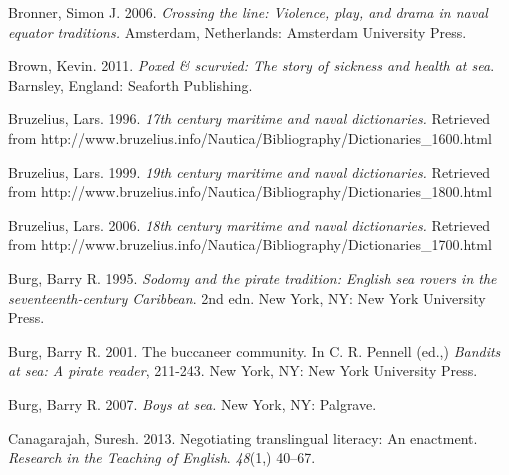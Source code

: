 \begin{styleStandard}
Bronner, Simon J. 2006.\textit{ Crossing the line: Violence, play, and drama in naval equator traditions. }Amsterdam, Netherlands: Amsterdam University Press. 
\end{styleStandard}

\begin{styleStandard}
Brown, Kevin. 2011. \textit{Poxed \& scurvied: The story of sickness and health at sea}. Barnsley, England: Seaforth Publishing.
\end{styleStandard}

\begin{styleStandard}
Bruzelius, Lars. 1996. \textit{17th century maritime and naval dictionaries. }Retrieved from http://www.bruzelius.info/Nautica/Bibliography/Dictionaries\_1600.html \ 
\end{styleStandard}

\begin{styleStandard}
Bruzelius, Lars. 1999. \textit{19th century maritime and naval dictionaries. }Retrieved from http://www.bruzelius.info/Nautica/Bibliography/Dictionaries\_1800.html 
\end{styleStandard}

\begin{styleStandard}
Bruzelius, Lars. 2006. \textit{18th century maritime and naval dictionaries. }Retrieved from http://www.bruzelius.info/Nautica/Bibliography/Dictionaries\_1700.html 
\end{styleStandard}

\begin{styleStandard}
Burg, Barry R. 1995. \textit{Sodomy and the pirate tradition: English sea rovers in the seventeenth-century Caribbean}. 2nd edn. New York, NY: New York University Press. 
\end{styleStandard}

\begin{styleStandard}
Burg, Barry R. 2001. The buccaneer community. In C. R. Pennell (ed.,) \textit{Bandits at sea: A pirate reader}, 211-243. New York, NY: New York University Press.
\end{styleStandard}

\begin{styleStandard}
Burg, Barry R. 2007. \textit{Boys at sea.} New York, NY: Palgrave.
\end{styleStandard}

\begin{styleStandard}
Canagarajah, Suresh. 2013. Negotiating translingual literacy: An enactment. \textit{Research in the Teaching of English}. \textit{48}(1,) 40–67.
\end{styleStandard}


